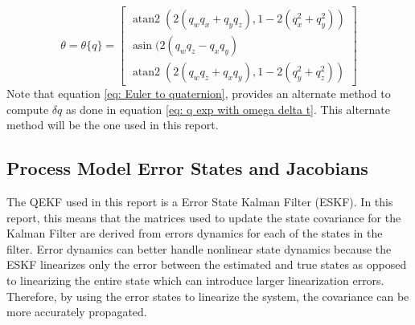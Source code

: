 \begin{equation}
    \theta = \theta\{q\} =\left[\begin{array}{c}\operatorname{atan2}\left(2\left(q_w q_x+q_y q_z\right), 1-2\left(q_x^2+q_y^2\right)\right) \\ \operatorname{asin} (2 (q_w q_z - q_x q_y) \\ \operatorname{atan2}\left(2\left(q_w q_z+q_x q_y\right), 1-2\left(q_y^2+q_z^2\right)\right)\end{array}\right]
    \label{eq: Quaternion to Euler}
\end{equation}
Note that equation \eqref{eq: Euler to quaternion}, provides an alternate method to compute $\delta q$ as done in equation \eqref{eq: q exp with omega delta t}. This alternate method will be the one used in this report.


\subsection{Process Model Error States and Jacobians}
The QEKF used in this report is a Error State Kalman Filter (ESKF). In this report, this means that the matrices used to update the state covariance for the Kalman Filter are derived from errors dynamics for each of the states in the filter. Error dynamics can better handle nonlinear state dynamics because the ESKF linearizes only the error between the estimated and true states as opposed to linearizing the entire state which can introduce larger linearization errors. Therefore, by using the error states to linearize the system, the covariance can be more accurately propagated.

